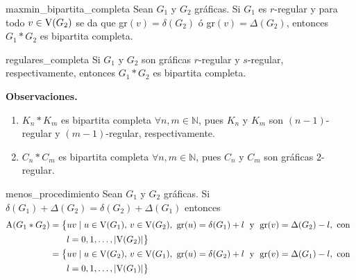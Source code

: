 \documentclass[fleqn, 11pt]{article}
\begin{document}
    \begin{corolario}[beforeafter skip = 4mm]{}{maxmin_bipartita_completa}
        Sean $ G_1 $ y $ G_2 $ gráficas. Si $ G_1 $ es $ r $-regular y para todo $ v \in \textnormal{V}(G_2) $ se da que gr$(v) = \delta(G_2) $ ó gr$(v) = \Delta(G_2) $, entonces $ G_1 \ast G_2 $ es bipartita completa.
    \end{corolario}

    \begin{corolario}[beforeafter skip = 4mm]{}{regulares_completa}
        Si $ G_1 $ y $ G_2 $ son gráficas $ r $-regular y $ s $-regular, respectivamente, entonces $ G_1 \ast G_2 $ es bipartita completa.
    \end{corolario}

    \textbf{Observaciones.}

    \begin{enumerate}
        \item $ K_n \ast K_m $ es bipartita completa $ \forall n, m \in \mathbb{N} $, pues $ K_n $ y $ K_m $ son $ (n-1) $-regular y $ (m-1) $-regular, respectivamente.
        \item $ C_n \ast C_m $ es bipartita completa $ \forall n, m \in \mathbb{N} $, pues $ C_n $ y $ C_m $ son gráficas $ 2 $-regular.
    \end{enumerate} \vspace{1mm}

    \begin{proposicion}[beforeafter skip = 4mm]{}{menos_procedimiento}
        Sean $ G_1 $ y $ G_2 $ gráficas. Si $ \delta(G_1) + \Delta(G_2) = \delta(G_2) + \Delta(G_1) $ entonces \begin{align*}
            \textnormal{A}(G_1 \ast G_2) &= \left\{ uv \mid u \in \textnormal{V}(G_1), \, v \in \textnormal{V}(G_2), \textnormal{ gr}(u) = \delta(G_1) + l \phantom{|_i^i} \textnormal{y} \phantom{|_i^i} \textnormal{gr}(v) = \Delta(G_2) - l, \textnormal{ con } \right. \\
            & \left. \quad \phantom{|_i^i} l = 0,1, \ldots, \lvert \textnormal{V}(G_2) \rvert \right\} \\
            &= \left\{ uv \mid u \in \textnormal{V}(G_2), \, v \in \textnormal{V}(G_1), \textnormal{ gr}(u) = \delta(G_2) + l \phantom{|_i^i} \textnormal{y} \phantom{|_i^i} \textnormal{gr}(v) = \Delta(G_1) - l, \textnormal{ con } \right. \\
            & \left. \quad \phantom{|_i^i} l = 0,1, \ldots, \lvert \textnormal{V}(G_1) \rvert \right\}
        \end{align*}
    \end{proposicion}
\end{document}
